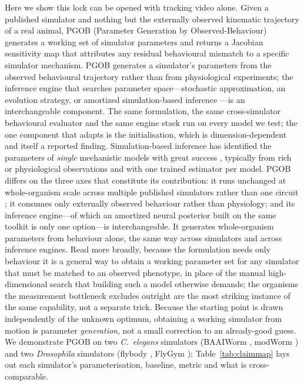 \documentclass[11pt]{article}
\begin{document}
Here we show this lock can be opened with tracking video alone. Given a published simulator and nothing but the externally observed kinematic trajectory of a real animal, PGOB (Parameter Generation by Observed-Behaviour) generates a working set of simulator parameters and returns a Jacobian sensitivity map that attributes any residual behavioural mismatch to a specific simulator mechanism. PGOB generates a simulator's parameters from the observed behavioural trajectory rather than from physiological experiments; the inference engine that searches parameter space---stochastic approximation, an evolution strategy, or amortized simulation-based inference \citep{cranmer2020frontier}---is an interchangeable component. The same formulation, the same cross-simulator behavioural evaluator and the same engine stack run on every model we test; the one component that adapts is the initialisation, which is dimension-dependent and itself a reported finding. Simulation-based inference has identified the parameters of \emph{single} mechanistic models with great success \citep{goncalves2020training}, typically from rich or physiological observations and with one trained estimator per model. PGOB differs on the three axes that constitute its contribution: it runs unchanged at whole-organism scale across multiple published simulators rather than one circuit \citep{izquierdo2013connecting}; it consumes only externally observed behaviour rather than physiology; and its inference engine---of which an amortized neural posterior built on the same toolkit \citep{tejero2020sbi} is only one option---is interchangeable. It generates whole-organism parameters from behaviour alone, the same way across simulators and across inference engines. Read more broadly, because the formulation needs only behaviour it is a general way to obtain a working parameter set for any simulator that must be matched to an observed phenotype, in place of the manual high-dimensional search that building such a model otherwise demands; the organisms the measurement bottleneck excludes outright are the most striking instance of the same capability, not a separate trick. Because the starting point is drawn independently of the unknown optimum, obtaining a working simulator from motion is parameter \emph{generation}, not a small correction to an already-good guess. We demonstrate PGOB on two \emph{C.~elegans} simulators (BAAIWorm \citep{wang2025baaiworm}, modWorm \citep{shlizerman2025modworm}) and two \emph{Drosophila} simulators (flybody \citep{vaxenburg2025flybody}, FlyGym \citep{wangchen2024neuromechfly}); Table~\ref{tab:claimmap} lays out each simulator's parameterisation, baseline, metric and what is cross-comparable.
\end{document}
